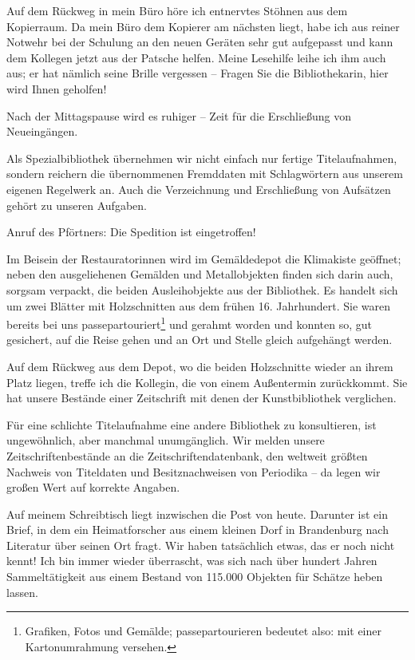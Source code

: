 \documentclass[a4paper,
fontsize=11pt,
oneside,
numbers=noperiodatend,
parskip=half-,
bibliography=totoc,
final
]{scrartcl}
\begin{document}
Auf dem Rückweg in mein Büro höre ich entnervtes Stöhnen aus dem
Kopierraum. Da mein Büro dem Kopierer am nächsten liegt, habe ich aus
reiner Notwehr bei der Schulung an den neuen Geräten sehr gut aufgepasst
und kann dem Kollegen jetzt aus der Patsche helfen. Meine Lesehilfe
leihe ich ihm auch aus; er hat nämlich seine Brille vergessen -- Fragen
Sie die Bibliothekarin, hier wird Ihnen geholfen!

Nach der Mittagspause wird es ruhiger -- Zeit für die Erschließung von
Neueingängen.

Als Spezialbibliothek übernehmen wir nicht einfach nur fertige
Titelaufnahmen, sondern reichern die übernommenen Fremddaten mit
Schlagwörtern aus unserem eigenen Regelwerk an. Auch die Verzeichnung
und Erschließung von Aufsätzen gehört zu unseren Aufgaben.

Anruf des Pförtners: Die Spedition ist eingetroffen!

Im Beisein der Restauratorinnen wird im Gemäldedepot die Klimakiste
geöffnet; neben den ausgeliehenen Gemälden und Metallobjekten finden
sich darin auch, sorgsam verpackt, die beiden Ausleihobjekte aus der
Bibliothek. Es handelt sich um zwei Blätter mit Holzschnitten aus dem
frühen 16. Jahrhundert. Sie waren bereits bei uns
passepartouriert\footnote{ Grafiken, Fotos und Gemälde;
  passepartourieren bedeutet also: mit einer Kartonumrahmung versehen.}
und gerahmt worden und konnten so, gut gesichert, auf die Reise gehen
und an Ort und Stelle gleich aufgehängt werden.

Auf dem Rückweg aus dem Depot, wo die beiden Holzschnitte wieder an
ihrem Platz liegen, treffe ich die Kollegin, die von einem Außentermin
zurückkommt. Sie hat unsere Bestände einer Zeitschrift mit denen der
Kunstbibliothek verglichen.

Für eine schlichte Titelaufnahme eine andere Bibliothek zu konsultieren,
ist ungewöhnlich, aber manchmal unumgänglich. Wir melden unsere
Zeitschriftenbestände an die Zeitschriftendatenbank, den weltweit
größten Nachweis von Titeldaten und Besitznachweisen von Periodika -- da
legen wir großen Wert auf korrekte Angaben.

Auf meinem Schreibtisch liegt inzwischen die Post von heute. Darunter
ist ein Brief, in dem ein Heimatforscher aus einem kleinen Dorf in
Brandenburg nach Literatur über seinen Ort fragt. Wir haben tatsächlich
etwas, das er noch nicht kennt! Ich bin immer wieder überrascht, was
sich nach über hundert Jahren Sammeltätigkeit aus einem Bestand von
115.000 Objekten für Schätze heben lassen.
\end{document}
